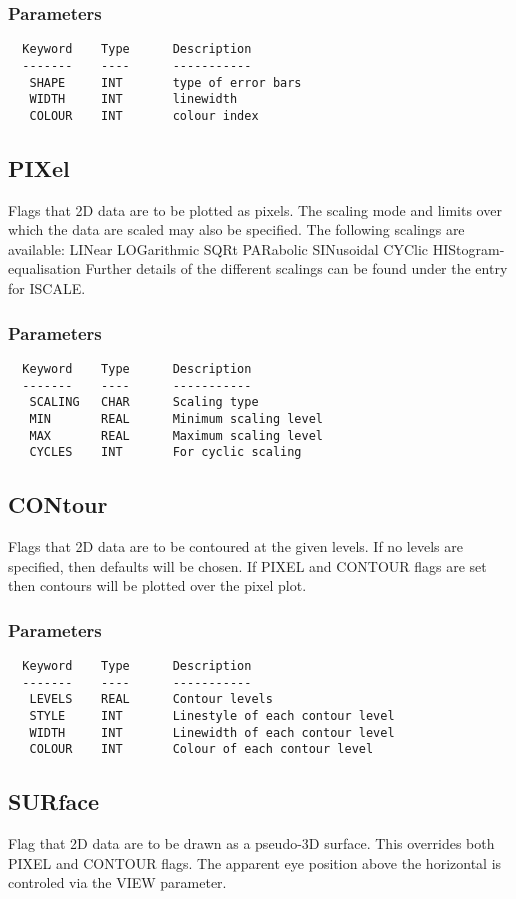 \documentclass{book}
\renewcommand{\_}{{\tt\char'137}}     %
\begin{document}
\subsubsection{Parameters}
\begin{verbatim}
  Keyword    Type      Description
  -------    ----      -----------
   SHAPE     INT       type of error bars
   WIDTH     INT       linewidth
   COLOUR    INT       colour index
\end{verbatim}\subsection{PIXel}
Flags that 2D data are to be plotted as pixels. The scaling mode
and limits over which the data are scaled may also be specified.
The following scalings are available:
LINear LOGarithmic SQRt PARabolic
SINusoidal CYClic HIStogram-equalisation
Further details of the different scalings can be found under the
entry for ISCALE.
\subsubsection{Parameters}
\begin{verbatim}
  Keyword    Type      Description
  -------    ----      -----------
   SCALING   CHAR      Scaling type
   MIN       REAL      Minimum scaling level
   MAX       REAL      Maximum scaling level
   CYCLES    INT       For cyclic scaling
\end{verbatim}\subsection{CONtour}
Flags that 2D data are to be contoured at the given levels. If
no levels are specified, then defaults will be chosen. If PIXEL
and CONTOUR flags are set then contours will be plotted over
the pixel plot.

\subsubsection{Parameters}
\begin{verbatim}
  Keyword    Type      Description
  -------    ----      -----------
   LEVELS    REAL      Contour levels
   STYLE     INT       Linestyle of each contour level
   WIDTH     INT       Linewidth of each contour level
   COLOUR    INT       Colour of each contour level
\end{verbatim}\subsection{SURface}
Flag that 2D data are to be drawn as a pseudo-3D surface. This
overrides both PIXEL and CONTOUR flags. The apparent eye position
above the horizontal is controled via the VIEW parameter.
\end{document}
